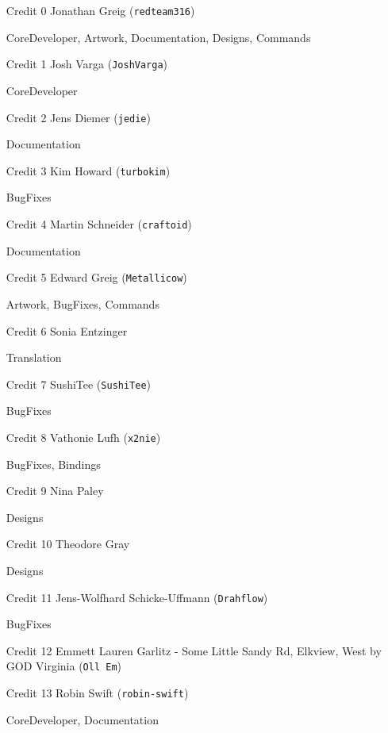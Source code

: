 \documentclass[onesize, a4paper]{refart}
\begin{document}
\begin{itemize}
\item[Credit 0] Jonathan Greig (\texttt{redteam316})

CoreDeveloper, Artwork, Documentation, Designs, Commands

\item[Credit 1] Josh Varga (\texttt{JoshVarga})

CoreDeveloper

\item[Credit 2] Jens Diemer (\texttt{jedie})

Documentation

\item[Credit 3] Kim Howard (\texttt{turbokim})

BugFixes

\item[Credit 4] Martin Schneider (\texttt{craftoid})

Documentation

\item[Credit 5] Edward Greig (\texttt{Metallicow})

Artwork, BugFixes, Commands

\item[Credit 6] Sonia Entzinger

Translation

\item[Credit 7] SushiTee (\texttt{SushiTee})

BugFixes

\item[Credit 8] Vathonie Lufh (\texttt{x2nie})

BugFixes, Bindings

\item[Credit 9] Nina Paley

Designs

\item[Credit 10] Theodore Gray

Designs

\item[Credit 11] Jens-Wolfhard Schicke-Uffmann (\texttt{Drahflow})

BugFixes

\item[Credit 12] Emmett Lauren Garlitz - Some Little Sandy Rd, Elkview, West by GOD Virginia (\texttt{Oll Em})

\item[Credit 13] Robin Swift (\texttt{robin-swift})

CoreDeveloper, Documentation

\end{itemize}
\end{document}
